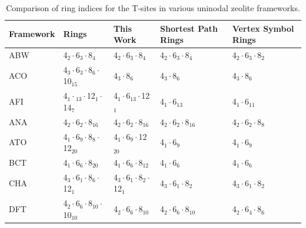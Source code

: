 \documentclass[preprint,numrefs,noinfo,sort&compress]{elsarticle}
\begin{document}
\begin{table}
\centering
\begin{threeparttable}
\caption{Comparison of ring indices for the T-sites in various uninodal zeolite frameworks. \label{tab:uninodal}}
{\scriptsize
\begin{tabular}{lllll}
\hline
Framework & Rings & This Work & Shortest Path Rings \cite{sastre-topological-2009} & Vertex Symbol Rings \cite{baerlocher-database-nodate}\\
\hline
ABW & 4\(_{\text{2}} \cdot\)6\(_{\text{3}} \cdot\)8\(_{\text{4}}\) & 4\(_{\text{2}} \cdot\)6\(_{\text{3}} \cdot\)8\(_{\text{4}}\) & 4\(_{\text{2}} \cdot\)6\(_{\text{3}} \cdot\)8\(_{\text{4}}\) & 4\(_{\text{2}} \cdot\)6\(_{\text{3}} \cdot\)8\(_{\text{2}}\)\\
ACO & 4\(_{\text{3}} \cdot\)6\(_{\text{3}} \cdot\)8\(_{\text{6}} \cdot\)10\(_{\text{15}}\) & 4\(_{\text{3}} \cdot\)8\(_{\text{6}}\) & 4\(_{\text{3}} \cdot\)8\(_{\text{6}}\) & 4\(_{\text{3}} \cdot\)8\(_{\text{6}}\)\\
AFI & 4\(_{\text{1}} \cdot\)\(_{\text{13}} \cdot\)12\(_{\text{1}} \cdot\)14\(_{\text{7}}\) & 4\(_{\text{1}} \cdot\)6\(_{\text{13}} \cdot\)12\(_{\text{1}}\) & 4\(_{\text{1}} \cdot\)6\(_{\text{13}}\) & 4\(_{\text{1}} \cdot\)6\(_{\text{11}}\)\\
ANA & 4\(_{\text{2}} \cdot\)6\(_{\text{2}} \cdot\)8\(_{\text{16}}\) & 4\(_{\text{2}} \cdot\)6\(_{\text{2}} \cdot\)8\(_{\text{16}}\) & 4\(_{\text{2}} \cdot\)6\(_{\text{2}} \cdot\)8\(_{\text{16}}\) & 4\(_{\text{2}} \cdot\)6\(_{\text{2}} \cdot\)8\(_{\text{8}}\)\\
ATO & 4\(_{\text{1}} \cdot\)6\(_{\text{9}} \cdot\)8\(_{\text{8}} \cdot\)12\(_{\text{20}}\) & 4\(_{\text{1}} \cdot\)6\(_{\text{9}} \cdot\)12\(_{\text{20}}\) & 4\(_{\text{1}} \cdot\)6\(_{\text{9}}\) & 4\(_{\text{1}} \cdot\)6\(_{\text{9}}\)\\
BCT & 4\(_{\text{1}} \cdot\)6\(_{\text{6}} \cdot\)8\(_{\text{20}}\) & 4\(_{\text{1}} \cdot\)6\(_{\text{6}} \cdot\)8\(_{\text{12}}\) & 4\(_{\text{1}} \cdot\)6\(_{\text{6}}\) & 4\(_{\text{1}} \cdot\)6\(_{\text{6}}\)\\
CHA & 4\(_{\text{3}} \cdot\)6\(_{\text{1}} \cdot\)8\(_{\text{6}} \cdot\)12\(_{\text{1}}\) & 4\(_{\text{3}} \cdot\)6\(_{\text{1}} \cdot\)8\(_{\text{2}} \cdot\)12\(_{\text{1}}\) & 4\(_{\text{3}} \cdot\)6\(_{\text{1}} \cdot\)8\(_{\text{2}}\) & 4\(_{\text{3}} \cdot\)6\(_{\text{1}} \cdot\)8\(_{\text{2}}\)\\
DFT & 4\(_{\text{2}} \cdot\)6\(_{\text{6}} \cdot\)8\(_{\text{10}} \cdot\)10\(_{\text{10}}\) & 4\(_{\text{2}} \cdot\)6\(_{\text{6}} \cdot\)8\(_{\text{10}}\) & 4\(_{\text{2}} \cdot\)6\(_{\text{6}} \cdot\)8\(_{\text{10}}\) & 4\(_{\text{2}} \cdot\)6\(_{\text{4}} \cdot\)8\(_{\text{6}}\)\\

\end{tabular}}
\end{threeparttable}
\end{table}
\end{document}
